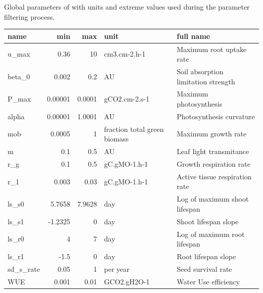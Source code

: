 \begin{table2*}
\centering
\caption[Parameters of \model]{Global parameters of \model with units and extreme values used during the parameter filtering process.}
\label{table:priors}
\begin{tabular}{lrrll}
name        & min     & max    & unit                         & full name                                         \\ \hline
u\_max      & 0.36    & 10     & cm3.cm-2.h-1                 & Maximum root uptake rate                           \\
beta\_0     & 0.002   & 0.2    & AU        		              & Soil absorption limitation strength                \\
P\_max      & 0.00001 & 0.0001 & gCO2.cm-2.s-1                & Maximum photosynthesis                             \\
alpha       & 0.00001 & 1.0001 & AU                           & Photosynthesis curvature                           \\
mob         & 0.0005  & 1      & fraction total green biomass & Maximum growth rate                                \\
m           & 0.1     & 0.5    & AU                           & Leaf light transmitance                            \\
r\_g        & 0.1     & 0.5    & gC.gMO-1.h-1                 & Growth respiration rate                            \\
r\_1        & 0.003   & 0.03   & gC.gMO-1.h-1                 & Active tissue respiration rate                     \\
ls\_s0      & 5.7658  & 7.9628 & day                          & Log of maximum shoot lifespan                      \\
ls\_s1      & -1.2325 & 0      & day                          & Shoot lifespan slope                               \\
ls\_r0      & 4       & 7      & day                          & Log of maximum root lifespan                       \\
ls\_r1      & -1.5    & 0      & day                          & Root lifespan slope                                \\
sd\_s\_rate & 0.05    & 1      & per year                     & Seed survival rate                                 \\
WUE         & 0.001   & 0.01   & GCO2.gH2O-1                  & Water Use efficiency                               \\

\end{tabular}
\end{table2*}
